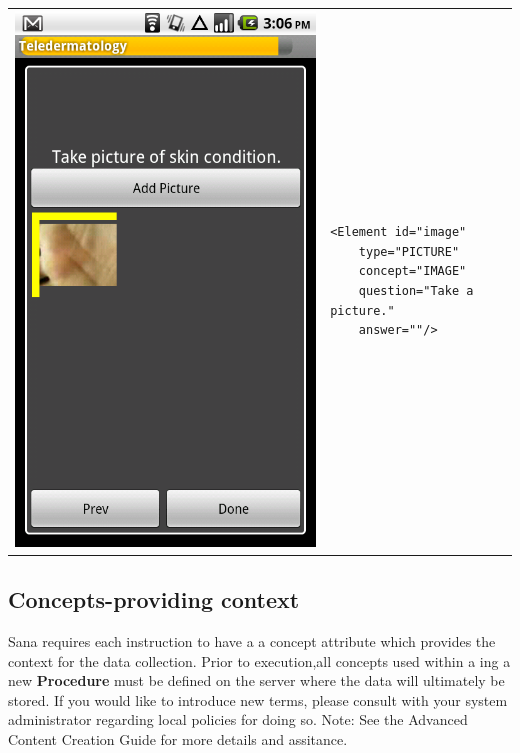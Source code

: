 \documentclass[a4paper,10pt]{article}
\begin{document}
\noindent\begin{tabular}{ p{3.5cm}  p{7.5cm} }
\includegraphics[scale=0.2,keepaspectratio=true]{client_picture.png}
& \begin{verbatim}
<Element id="image"
    type="PICTURE"  
    concept="IMAGE"  
    question="Take a picture."
    answer=""/>\end{verbatim}
\end{tabular}

\subsection{Concepts-providing context}
Sana requires each instruction to have a a concept attribute which provides the
context for the data collection. Prior to execution,all concepts used within a
ing a new \textbf{Procedure} must be defined on the server where the data will
ultimately be stored. If you would like to introduce new terms, please consult
with your system administrator regarding local policies for doing so.
Note: See the Advanced Content Creation Guide for more details and assitance. 
\end{document}

